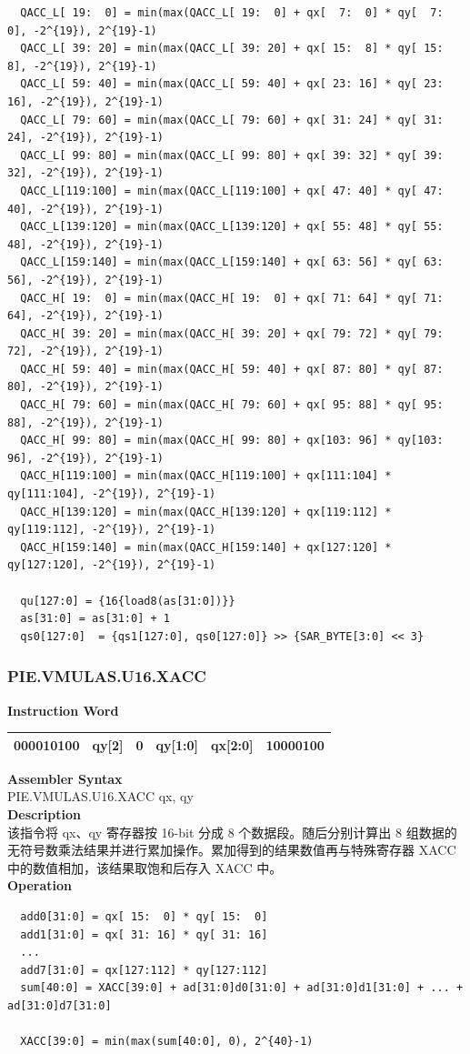 \begin{lstlisting}
  QACC_L[ 19:  0] = min(max(QACC_L[ 19:  0] + qx[  7:  0] * qy[  7:  0], -2^{19}), 2^{19}-1)
  QACC_L[ 39: 20] = min(max(QACC_L[ 39: 20] + qx[ 15:  8] * qy[ 15:  8], -2^{19}), 2^{19}-1)
  QACC_L[ 59: 40] = min(max(QACC_L[ 59: 40] + qx[ 23: 16] * qy[ 23: 16], -2^{19}), 2^{19}-1)
  QACC_L[ 79: 60] = min(max(QACC_L[ 79: 60] + qx[ 31: 24] * qy[ 31: 24], -2^{19}), 2^{19}-1)
  QACC_L[ 99: 80] = min(max(QACC_L[ 99: 80] + qx[ 39: 32] * qy[ 39: 32], -2^{19}), 2^{19}-1)
  QACC_L[119:100] = min(max(QACC_L[119:100] + qx[ 47: 40] * qy[ 47: 40], -2^{19}), 2^{19}-1)
  QACC_L[139:120] = min(max(QACC_L[139:120] + qx[ 55: 48] * qy[ 55: 48], -2^{19}), 2^{19}-1)
  QACC_L[159:140] = min(max(QACC_L[159:140] + qx[ 63: 56] * qy[ 63: 56], -2^{19}), 2^{19}-1)
  QACC_H[ 19:  0] = min(max(QACC_H[ 19:  0] + qx[ 71: 64] * qy[ 71: 64], -2^{19}), 2^{19}-1)
  QACC_H[ 39: 20] = min(max(QACC_H[ 39: 20] + qx[ 79: 72] * qy[ 79: 72], -2^{19}), 2^{19}-1)
  QACC_H[ 59: 40] = min(max(QACC_H[ 59: 40] + qx[ 87: 80] * qy[ 87: 80], -2^{19}), 2^{19}-1)
  QACC_H[ 79: 60] = min(max(QACC_H[ 79: 60] + qx[ 95: 88] * qy[ 95: 88], -2^{19}), 2^{19}-1)
  QACC_H[ 99: 80] = min(max(QACC_H[ 99: 80] + qx[103: 96] * qy[103: 96], -2^{19}), 2^{19}-1)
  QACC_H[119:100] = min(max(QACC_H[119:100] + qx[111:104] * qy[111:104], -2^{19}), 2^{19}-1)
  QACC_H[139:120] = min(max(QACC_H[139:120] + qx[119:112] * qy[119:112], -2^{19}), 2^{19}-1)
  QACC_H[159:140] = min(max(QACC_H[159:140] + qx[127:120] * qy[127:120], -2^{19}), 2^{19}-1)

  qu[127:0] = {16{load8(as[31:0])}}
  as[31:0] = as[31:0] + 1
  qs0[127:0]  = {qs1[127:0], qs0[127:0]} >> {SAR_BYTE[3:0] << 3}
\end{lstlisting}

\newpage
\subsubsection{PIE.VMULAS.U16.XACC}\label{instruction:PIEVMULASU16XACC}
\setlength\tabcolsep{6pt}
\textbf{Instruction Word} \\
\begin{tabular}{|c|c|c|c|c|c|}
	\hline
	000010100 & qy[2] & 0 & qy[1:0] & qx[2:0] & 10000100 \\
	\hline
\end{tabular}

\textbf{Assembler Syntax} \\
PIE.VMULAS.U16.XACC qx, qy \\
\textbf{Description} \\
该指令将 qx、qy 寄存器按 16-bit 分成 8 个数据段。随后分别计算出 8 组数据的无符号数乘法结果并进行累加操作。累加得到的结果数值再与特殊寄存器 XACC 中的数值相加，该结果取饱和后存入 XACC 中。\\
\textbf{Operation}
\begin{lstlisting}
  add0[31:0] = qx[ 15:  0] * qy[ 15:  0]
  add1[31:0] = qx[ 31: 16] * qy[ 31: 16]
  ...
  add7[31:0] = qx[127:112] * qy[127:112]
  sum[40:0] = XACC[39:0] + ad[31:0]d0[31:0] + ad[31:0]d1[31:0] + ... + ad[31:0]d7[31:0]

  XACC[39:0] = min(max(sum[40:0], 0), 2^{40}-1)
\end{lstlisting}

